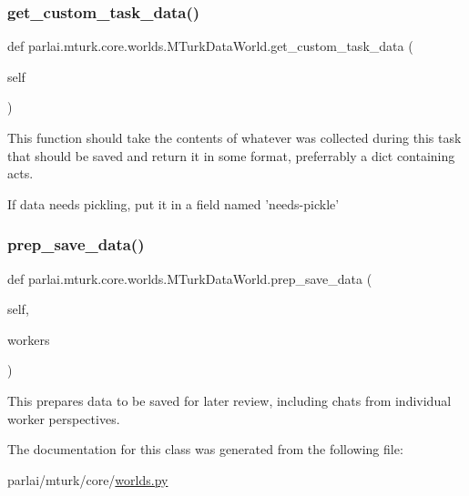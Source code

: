\subsubsection{\texorpdfstring{get\+\_\+custom\+\_\+task\+\_\+data()}{get\_custom\_task\_data()}}
{\footnotesize\ttfamily def parlai.\+mturk.\+core.\+worlds.\+M\+Turk\+Data\+World.\+get\+\_\+custom\+\_\+task\+\_\+data (\begin{DoxyParamCaption}\item[{}]{self }\end{DoxyParamCaption})}

\begin{DoxyVerb}This function should take the contents of whatever was collected during this
task that should be saved and return it in some format, preferrably a dict
containing acts.

If data needs pickling, put it in a field named 'needs-pickle'
\end{DoxyVerb}
 \mbox{\label{classparlai_1_1mturk_1_1core_1_1worlds_1_1MTurkDataWorld_a13f5b85f9694627df2e181267588d4dc}} 
\subsubsection{\texorpdfstring{prep\+\_\+save\+\_\+data()}{prep\_save\_data()}}
{\footnotesize\ttfamily def parlai.\+mturk.\+core.\+worlds.\+M\+Turk\+Data\+World.\+prep\+\_\+save\+\_\+data (\begin{DoxyParamCaption}\item[{}]{self,  }\item[{}]{workers }\end{DoxyParamCaption})}

\begin{DoxyVerb}This prepares data to be saved for later review, including chats from individual
worker perspectives.
\end{DoxyVerb}
 

The documentation for this class was generated from the following file\+:\begin{DoxyCompactItemize}
\item 
parlai/mturk/core/\hyperlink{parlai_2mturk_2core_2worlds_8py}{worlds.\+py}\end{DoxyCompactItemize}
